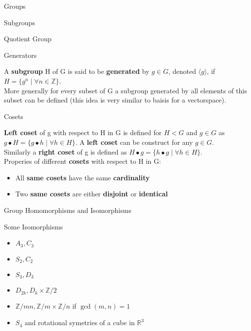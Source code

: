 \documentclass[12pt, letterpaper]{article}
\begin{document}
\begin{section}{Groups}
\begin{subsection}{Subgroups}
\begin{subsubsection}{Quotient Group}
    \end{subsubsection}

    \begin{subsubsection}{Generators}

      A \textbf{subgroup} H of G is said to be \textbf{generated} by \(g \in G\),
      denoted \(\langle g \rangle\), if \(H = \{ g^{n} \; | \; \forall n \in \mathbb{Z} \}\). \\
      More generally for every subset of G a subgroup generated by all elements
      of this subset can be defined (this idea is very similar to baisis for a
      vectorspace).

    \end{subsubsection}

  \end{subsection}

  \begin{subsection}{Cosets}

    \textbf{Left coset} of g with respect to H in G is defined for \(H < G\)
    and \(g \in G\) as \(g \bullet H = \{{} g \bullet h \; | \; \forall h \in H \}{}\).
    A \textbf{left coset} can be construct for any \(g \in G\). \\
    Similarly a \textbf{right coset} of g is defined as
    \(H \bullet g = \{{} h \bullet g \; | \; \forall h \in H \}{}\). \\
    Properies of different \textbf{cosets} with respect to H in G:
    \begin{itemize}
      \item All \textbf{same cosets} have the same \textbf{cardinality}
      \item Two \textbf{same cosets} are either \textbf{disjoint} or \textbf{identical}
    \end{itemize}

  \end{subsection}

  \begin{subsection}{Group Homomorphisms and Isomorphisms}

    \begin{subsubsection}{Some Isomorphisms}

      \begin{itemize}
        \item \(A_{3}, C_{3}\)
        \item \(S_{2}, C_{2}\)
        \item \(S_{3}, D_{3}\)
        \item \(D_{2k}, D_{k} \times \mathbb{Z} / 2\)
        \item \(\mathbb{Z} / mn, \mathbb{Z} / m \times \mathbb{Z} / n\) if \(\gcd(m, n) = 1\)
        \item \(S_{4}\) and rotational symetries of a cube in \(\mathbb{R}^{3}\)
      \end{itemize}


\end{subsubsection}
\end{subsection}
\end{section}
\end{document}
